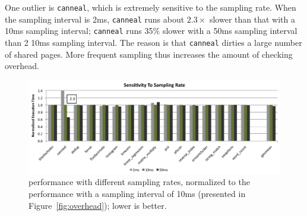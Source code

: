 One outlier is \texttt{canneal}, which is extremely sensitive to the sampling rate.  When the sampling interval is 2ms, \texttt{canneal} runs about $2.3\times$ slower than that with  a 10ms sampling interval; \texttt{canneal} runs 35\% slower with a 50ms sampling interval than 2 10ms
sampling interval. The reason is that \texttt{canneal} dirties a large number of shared pages. More frequent sampling thus increases the amount of checking overhead.


\begin{figure}[!t]
\centering
\includegraphics[width=5in]{sheriff/figure/sensitivity}
\caption{\sheriffdetect{} performance with different sampling rates,  normalized to the performance with a sampling interval of 10ms (presented in Figure~\ref{fig:overhead}); lower is better.
\label{fig:sensitivity}}
\end{figure}

\begin{table}[!t]
\centering
{}
\caption{
\sheriffdetect{} precision with different sampling rates, including the number of falsely-shared objects and interleaved writes. We omit those benchmarks with no observed cases of false sharing.
\label{table:samplingquality}}
\end{table}

